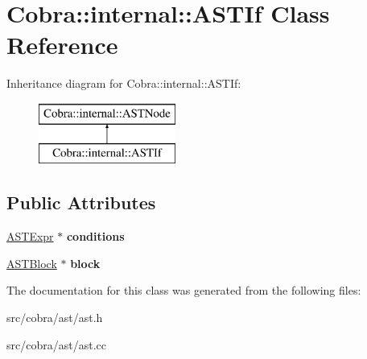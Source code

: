 \hypertarget{class_cobra_1_1internal_1_1_a_s_t_if}{\section{Cobra\+:\+:internal\+:\+:A\+S\+T\+If Class Reference}
\label{class_cobra_1_1internal_1_1_a_s_t_if}
}
Inheritance diagram for Cobra\+:\+:internal\+:\+:A\+S\+T\+If\+:\begin{figure}[H]
\begin{center}
\leavevmode
\includegraphics[height=2.000000cm]{class_cobra_1_1internal_1_1_a_s_t_if}
\end{center}
\end{figure}
\subsection*{Public Attributes}
\begin{DoxyCompactItemize}
\item 
\hypertarget{class_cobra_1_1internal_1_1_a_s_t_if_a8131dd336fcda4d14ee7f6ed6e1a4807}{\hyperlink{class_cobra_1_1internal_1_1_a_s_t_expr}{A\+S\+T\+Expr} $\ast$ {\bfseries conditions}}\label{class_cobra_1_1internal_1_1_a_s_t_if_a8131dd336fcda4d14ee7f6ed6e1a4807}

\item 
\hypertarget{class_cobra_1_1internal_1_1_a_s_t_if_a487d09082eab4efc05cb3415987fc0b9}{\hyperlink{class_cobra_1_1internal_1_1_a_s_t_block}{A\+S\+T\+Block} $\ast$ {\bfseries block}}\label{class_cobra_1_1internal_1_1_a_s_t_if_a487d09082eab4efc05cb3415987fc0b9}

\end{DoxyCompactItemize}


The documentation for this class was generated from the following files\+:\begin{DoxyCompactItemize}
\item 
src/cobra/ast/ast.\+h\item 
src/cobra/ast/ast.\+cc\end{DoxyCompactItemize}

